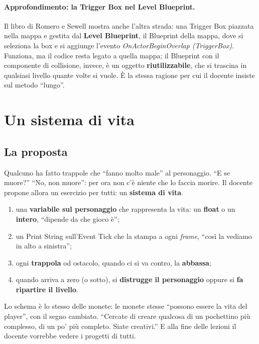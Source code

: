 \paragraph{Approfondimento: la Trigger Box nel Level Blueprint.} Il libro di
Romero e Sewell mostra anche l'altra strada: una Trigger Box piazzata nella
mappa e gestita dal \textbf{Level Blueprint}, il Blueprint della mappa, dove
si seleziona la box e si aggiunge l'evento \emph{OnActorBeginOverlap
(TriggerBox)}. Funziona, ma il codice resta legato a quella mappa; il
Blueprint con il componente di collisione, invece, è un oggetto
\textbf{riutilizzabile}, che si trascina in qualsiasi livello quante volte si
vuole. È la stessa ragione per cui il docente insiste sul metodo ``lungo''.

\section{Un sistema di vita}
\label{gd7:sec:vita}

\subsection{La proposta}

Qualcuno ha fatto trappole che ``fanno molto male'' al personaggio. ``E se
muore?'' ``No, non muore'': per ora non c'è niente che lo faccia morire. Il
docente propone allora un esercizio per tutti: un \textbf{sistema di vita}.
\begin{enumerate}
  \item una \textbf{variabile sul personaggio} che rappresenta la vita: un
        \textbf{float} o un \textbf{intero}, ``dipende da che gioco è'';
  \item un Print String sull'Event Tick che la stampa a ogni \emph{frame},
        ``così la vediamo in alto a sinistra'';
  \item ogni \textbf{trappola} od ostacolo, quando ci si va contro, la
        \textbf{abbassa};
  \item quando arriva a zero (o sotto), si \textbf{distrugge il personaggio}
        oppure si \textbf{fa ripartire il livello}.
\end{enumerate}
Lo schema è lo stesso delle monete: le monete stesse ``possono essere la vita
del player'', con il segno cambiato. ``Cercate di creare qualcosa di un
pochettino più complesso, di un po' più completo. Siate creativi.'' E alla
fine delle lezioni il docente vorrebbe vedere i progetti di tutti.

